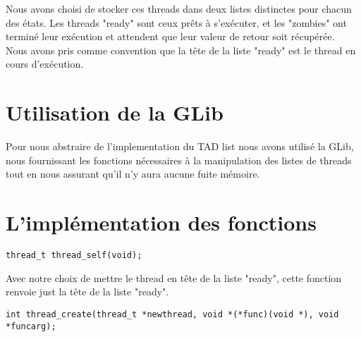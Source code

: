 \documentclass[12pt]{article}
\begin{document}
Nous avons choisi de stocker ces threads dans deux listes distinctes
pour chacun des états. Les threads "ready" sont ceux prêts à
s'exécuter, et les "zombies" ont terminé leur exécution et attendent
que leur valeur de retour soit récupérée.\\
Nous avons pris comme convention que la tête de la liste "ready" est
le thread en cours d'exécution.

\section {Utilisation de la GLib}

Pour nous abstraire de l'implementation du TAD list nous avons utilisé
la GLib, nous fournissant les fonctions nécessaires à la manipulation
des listes de threads tout en nous assurant qu'il n'y aura aucune
fuite mémoire.

\section {L'implémentation des fonctions}

\begin{verbatim}
thread_t thread_self(void);
\end{verbatim}
Avec notre choix de mettre le thread en tête de la liste "ready", 
cette fonction renvoie just la tête de la liste "ready".
~~\\
\begin{verbatim}
int thread_create(thread_t *newthread, void *(*func)(void *), void *funcarg);
\end{verbatim}
\end{document}

